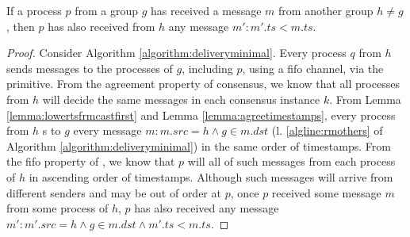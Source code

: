 \documentclass[times, 10pt]{article}
\begin{document}
\begin{lems} \label{lemma:groupfifo}
If a process $p$ from a group $g$ has received a message $m$ from another group $h \neq g$, then $p$ has also received from $h$ any message $m' : m'.ts < m.ts$.
\end{lems}

\begin{proof}
Consider Algorithm \ref{algorithm:deliveryminimal}. Every process $q$ from $h$ sends messages to the processes of $g$, including $p$, using a fifo channel, via the \rmcast{} primitive. From the agreement property of consensus, we know that all processes from $h$ will decide the same messages in each consensus instance $k$. From Lemma \ref{lemma:lowertsfrmcastfirst} and Lemma \ref{lemma:agreetimestamps}, every process from $h$ \rmcast{}s to $g$ every message $m : m.src = h \wedge g \in m.dst$ (l. \ref{algline:rmothers} of Algorithm \ref{algorithm:deliveryminimal}) in the same order of timestamps. From the fifo property of \rmcast{}, we know that $p$ will \rmdel{} all of such messages from each process of $h$ in ascending order of timestamps. Although such messages will arrive from different senders and may be out of order at $p$, once $p$ received some message $m$ from some process of $h$, $p$ has also received any message \mbox{$m' : m'.src = h \wedge g \in m.dst\wedge m'.ts < m.ts$}.
%
\end{proof}






% 
\end{document}
